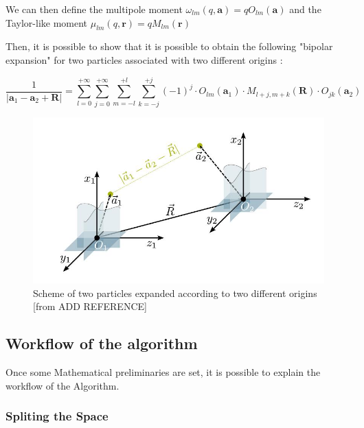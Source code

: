 \documentclass[12pt,twoside,a4paper]{report}
\begin{document}
	We can then define the multipole moment $\omega_{lm}(q,\textbf{a}) = q O_{lm}(\textbf{a})$ and the Taylor-like moment $\mu_{lm}(q,\textbf{r}) = q M_{lm}(\textbf{r})$
	
	Then, it is possible to show that it is possible to obtain the following "bipolar expansion" for two particles associated with two different origins :
	
    \begin{equation}
    \frac{1}{|\textbf{a}_1 - \textbf{a}_2 + \textbf{R}|} = 
    \sum\limits_{l=0}^{+\infty}
    \sum\limits_{j=0}^{+\infty}
    \sum\limits_{m=-l}^{+l}
    \sum\limits_{k=-j}^{+j}
    (-1)^j \cdot O_{lm}(\textbf{a}_1) \cdot M_{l+j,m+k}(\textbf{R}) \cdot O_{jk}(\textbf{a}_2)
    \end{equation}



	\begin{figure}[H]

    \includegraphics[scale=0.7]{bipolar}
    \centering 
    \caption{Scheme of two particles expanded according to two different origins [from ADD REFERENCE]}
    \label{fig:bipolar}
    \end{figure}




	
	\subsection{Workflow of the algorithm}
	
	Once some Mathematical preliminaries are set, it is possible to explain the workflow of the Algorithm.
	
	\subsubsection{Spliting the Space}
	
\end{document}
